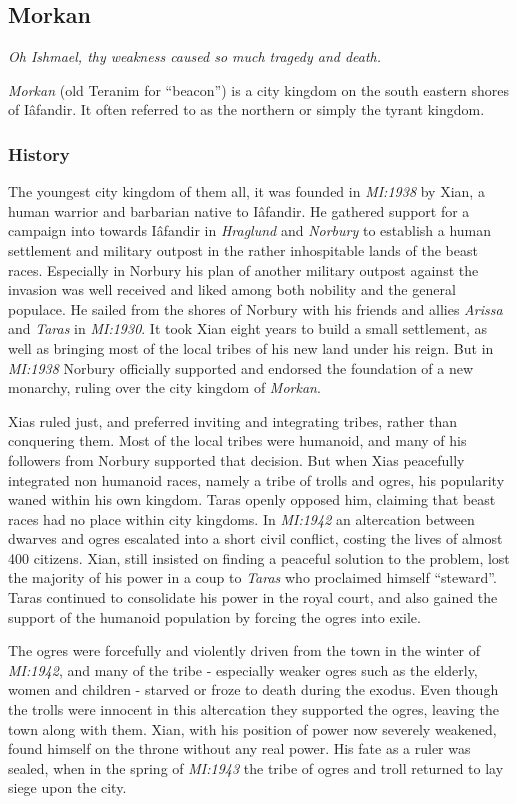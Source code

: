 \subsection*{Morkan}

\emph{Oh Ishmael, thy weakness caused so much tragedy and death.}

\emph{Morkan} (old Teranim for ``beacon'') is a city kingdom on the south
eastern shores of Iâfandir. It often referred to as the northern or simply
the tyrant kingdom.

\subsubsection*{History}

The youngest city kingdom of them all, it was founded in \emph{MI:1938} by
Xian, a human warrior and barbarian native to Iâfandir. He gathered support
for a campaign into towards Iâfandir in \emph{Hraglund} and \emph{Norbury} to
establish a human settlement and military outpost in the rather inhospitable
lands of the beast races. Especially in Norbury his plan of another military
outpost against the invasion was well received and liked among both nobility
and the general populace. He sailed from the shores of Norbury with his friends
and allies \emph{Arissa} and \emph{Taras} in \emph{MI:1930}. It took Xian
eight years to build a small settlement, as well as bringing most of the local
tribes of his new land under his reign. But in \emph{MI:1938} Norbury
officially supported and endorsed the foundation of a new monarchy, ruling
over the city kingdom of \emph{Morkan}.

Xias ruled just, and preferred inviting and integrating tribes, rather than
conquering them.  Most of the local tribes were humanoid, and many of his
followers from Norbury supported that decision. But when Xias peacefully
integrated non humanoid races, namely a tribe of trolls and ogres, his
popularity waned within his own kingdom. Taras openly opposed him, claiming
that beast races had no place within city kingdoms. In \emph{MI:1942} an
altercation between dwarves and ogres escalated into a short civil conflict,
costing the lives of almost 400 citizens. Xian, still insisted on finding a
peaceful solution to the problem, lost the majority of his power in a coup to
\emph{Taras} who proclaimed himself ``steward''. Taras continued to
consolidate his power in the royal court, and also gained the support of the
humanoid population by forcing the ogres into exile.

The ogres were forcefully and violently driven from the town in the winter of
\emph{MI:1942}, and many of the tribe - especially weaker ogres such as the
elderly, women and children - starved or froze to death during the exodus. Even
though the trolls were innocent in this altercation they supported the ogres,
leaving the town along with them. Xian, with his position of power now
severely weakened, found himself on the throne without any real power. His
fate as a ruler was sealed, when in the spring of \emph{MI:1943} the tribe of
ogres and troll returned to lay siege upon the city. 

